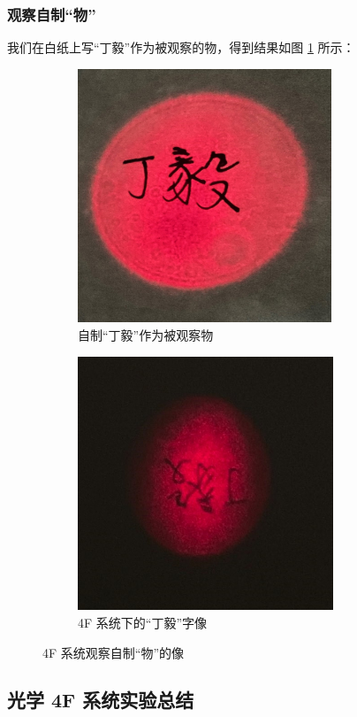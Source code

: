 \documentclass[UTF8]{article}
\theoremstyle{MyLineTheoremStyle} %
\theoremstyle{MyBlockTheoremStyle} %
\theoremstyle{MySubsubsectionStyle} %
\begin{document}
\subsubsection{观察自制“物”}
我们在白纸上写“丁毅”作为被观察的物，得到结果如图 \ref{4F 系统观察自制“物”的像} 所示：
\begin{figure}[H]\centering
\begin{subfigure}[b]{0.5\columnwidth}\centering
    \includegraphics[height=215pt]{assets/2 透镜4F/透镜4F 自制物.jpg}
    \caption{自制“丁毅”作为被观察物}
\end{subfigure}\hfill
\begin{subfigure}[b]{0.5\columnwidth}\centering
    \includegraphics[height=215pt]{assets/2 透镜4F/透镜4F 自制物 像.jpg}
    \caption{4F 系统下的“丁毅”字像}
\end{subfigure}
\caption{4F 系统观察自制“物”的像}
\label{4F 系统观察自制“物”的像}
\end{figure}



\subsection{光学 4F 系统实验总结}
\end{document}
